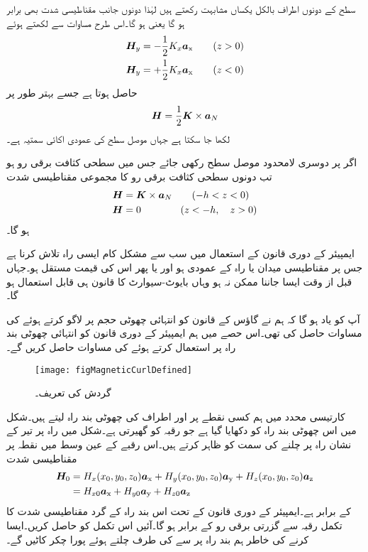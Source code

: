 سطح کے دونوں اطراف بالکل یکساں مشابہت رکھتے ہیں لہٰذا دونوں جانب  مقناطیسی شدت بھی برابر ہو گا یعنی  ہو گا۔اس طرح مساوات  سے  لکھتے ہوئے
\begin{align*}
{\ensuremath{{\boldsymbol{H}}}}_{y}&=-\frac{1}{2}K_x {\boldsymbol{a}}_{\textup{x}} \quad \quad (z>0)\\
{{\boldsymbol{H}}}_{y}&=+\frac{1}{2}K_x {\boldsymbol{a}}_{\textup{x}} \quad \quad (z<0)
\end{align*}
حاصل ہوتا ہے جسے  بہتر طور پر 
\begin{align}
{\ensuremath{{\boldsymbol{H}}}}=\frac{1}{2} {{\boldsymbol{K}}} \times {\boldsymbol{a}}_N
\end{align}
لکھا جا سکتا ہے جہاں  موصل سطح کی عمودی اکائی سمتیہ ہے۔

اگر  پر دوسری لامحدود موصل سطح رکھی جائے جس میں سطحی کثافت برقی رو  ہو تب دونوں سطحی کثافت برقی رو کا مجموعی مقناطیسی شدت
\begin{gather}
\begin{aligned}
{\ensuremath{{\boldsymbol{H}}}}&={{\boldsymbol{K}}} \times {\boldsymbol{a}}_N \quad \quad (-h <z < 0)\\
{{\boldsymbol{H}}}&=0 \quad \quad \quad \quad  (z<-h, \quad z>0) 
\end{aligned}
\end{gather}
ہو گا۔

ایمپیئر کے دوری قانون کے استعمال میں سب سے مشکل کام ایسی راہ تلاش کرنا ہے جس پر مقناطیسی میدان یا راہ کے عمودی ہو اور یا پھر اس کی قیمت مستقل ہو۔جہاں قبل از وقت ایسا جاننا ممکن نہ ہو وہاں بایوٹ-سیوارٹ کا قانون ہی قابل استعمال ہو گا۔ 

آپ کو یاد ہو گا کہ ہم نے گاؤس کے قانون کو انتہائی چھوٹی حجم پر لاگو کرتے ہوئے   کی مساوات حاصل کی تھی۔اس حصے میں ہم ایمپیئر کے دوری قانون کو انتہائی چھوٹی بند راہ پر استعمال کرتے ہوئے  کی مساوات حاصل کریں گے۔
\begin{figure}
\centering
\texttt{[image: figMagneticCurlDefined]}
\caption{گردش کی تعریف۔ }
\label{شکل-مقناطیسی_گردش_تعریف}
\end{figure}

کارتیسی محدد میں ہم کسی نقطے  پر   اور  اطراف کی چھوٹی بند راہ لیتے ہیں۔شکل  میں اس چھوٹی بند راہ کو دکھایا گیا ہے جو رقبہ  کو گھیرتی ہے۔شکل میں راہ پر تیر کے نشان راہ پر چلنے کی سمت کو ظاہر کرتے  ہیں۔اس رقبے کے عین وسط میں نقطہ  پر مقناطیسی شدت 
\begin{align*}
{\ensuremath{{\boldsymbol{H}}}}_0&=H_x(x_0,y_0,z_0){\boldsymbol{a}}_{\textup{x}}+H_y(x_0,y_0,z_0){\boldsymbol{a}}_{\textup{y}}+H_z(x_0,y_0,z_0){\boldsymbol{a}}_{\textup{z}}\\
&=H_{x0}{\boldsymbol{a}}_{\textup{x}}+H_{y0}{\boldsymbol{a}}_{\textup{y}}+H_{z0}{\boldsymbol{a}}_{\textup{z}}
\end{align*}
کے برابر ہے۔ایمپیئر کے دوری قانون کے تحت اس بند راہ کے گرد مقناطیسی شدت کا تکمل رقبہ  سے گزرتی برقی رو کے برابر ہو گا۔آئیں اس تکمل کو حاصل کریں۔ایسا کرنے کی خاطر ہم بند راہ پر سے  کی طرف چلتے ہوئے پورا چکر کاٹیں گے۔

